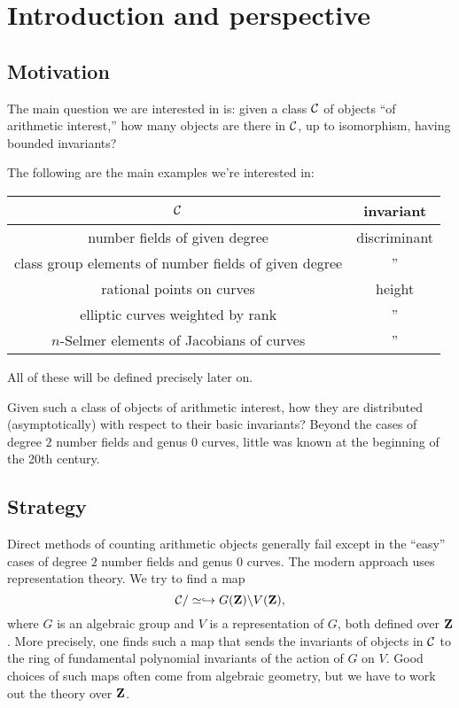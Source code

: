 
\section{Introduction and perspective}\label{sec:bhargava-i}





\subsection{Motivation}

The main question we are interested in is: given a class $\mathcal{C}$ of objects ``of 
arithmetic interest,'' how many objects are there in $\mathcal{C}$, up to isomorphism, 
having bounded invariants? 

\begin{example}
The following are the main examples we're interested in: 
\begin{center}
\begin{tabular}{c|c}
$\mathcal{C}$ & invariant \\ \hline
number fields of given degree & discriminant \\
class group elements of number fields of given degree & '' \\
rational points on curves & height \\
elliptic curves weighted by rank & '' \\
$n$-Selmer elements of Jacobians of curves & '' 
\end{tabular}
\end{center}
All of these will be defined precisely later on. 
\end{example}

Given such a class of objects of arithmetic interest, how they are distributed 
(asymptotically) with respect to their basic invariants? Beyond the cases of 
degree $2$ number fields and genus $0$ curves, little was known at the 
beginning of the 20th century. 





\subsection{Strategy}

Direct methods of counting arithmetic objects generally fail except in the 
``easy'' cases of degree $2$ number fields and genus $0$ curves. The modern 
approach uses representation theory. We try to find a map 
\[
  \mathcal{C}/\simeq \hookrightarrow G(\mathbf{Z})\backslash V(\mathbf{Z}) ,
\]
where $G$ is an algebraic group and $V$ is a representation of $G$, both 
defined over $\mathbf{Z}$. More precisely, one finds such a map that sends the 
invariants of objects in $\mathcal{C}$ to the ring of fundamental polynomial 
invariants of the action of $G$ on $V$. Good choices of such maps often come 
from algebraic geometry, but we have to work out the theory over $\mathbf{Z}$. 

